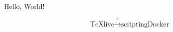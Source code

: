 \documentclass{article}
\begin{document}
    Hello, World!

    \[ \text{TeXlive} \xrightarrow^{\text{scripting}} \text{Docker} \]
\end{document}
